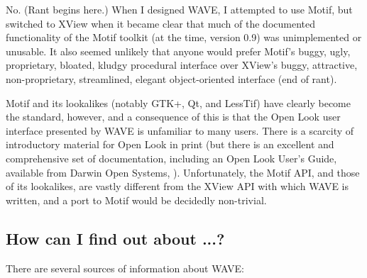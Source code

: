 \documentclass[twoside]{book}
\newcommand{\WAVE}{{\sf WAVE}\xspace}
\begin{document}
No.  (Rant begins here.)  When I designed \WAVE{}, I attempted to use
Motif, but switched to XView when it became clear that much of the
documented functionality of the Motif toolkit (at the time, version
0.9) was unimplemented or unusable.  It also seemed unlikely that
anyone would prefer Motif's buggy, ugly, proprietary, bloated, kludgy
procedural interface over XView's buggy, attractive, non-proprietary,
streamlined, elegant object-oriented interface (end of rant).

Motif and its lookalikes (notably GTK+, Qt, and LessTif) have clearly become
the standard, however, and a consequence of this is that the Open Look user
interface presented by \WAVE{} is unfamiliar to many users.  There is a
scarcity of introductory material for Open Look in print (but there is an
excellent and comprehensive set of documentation, including an Open Look User's
Guide, available from Darwin Open Systems, ).  Unfortunately, the
Motif API, and those of its lookalikes, are vastly different from the XView API
with which \WAVE{} is written, and a port to Motif would be decidedly
non-trivial.

\subsection{How can I find out about ...?}

There are several sources of information about \WAVE{}:
\end{document}
